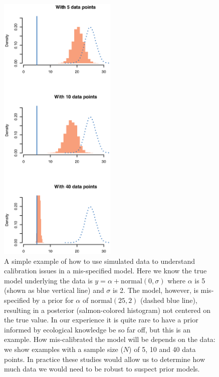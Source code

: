 \documentclass[11pt]{article}
\begin{document}
\begin{figure}[ht]
\centering
\noindent \includegraphics[width=0.5\textwidth]{priorpostforflows.eps}
\caption{A simple example of how to use simulated data to understand calibration issues in a mis-specified model. Here we know the true model underlying the data is $y=\alpha + \text{normal}(0, \sigma)$ where $\alpha$ is 5 (shown as blue vertical line) and $\sigma$ is 2. The model, however, is mis-specified by a prior for $\alpha$ of $\text{normal}(25, 2)$ (dashed blue line), resulting in a posterior (salmon-colored histogram) not centered on the true value. In our experience it is quite rare to have a prior informed by ecological knowledge be so far off, but this is an example. How mis-calibrated the model will be depends on the data: we show examples with a sample size ($N$) of 5, 10 and 40 data points. In practice these studies would allow us to determine how much data we would need to be robust to suspect prior models. }
\label{fig:misspecifyprior}
\end{figure}
\end{document}
